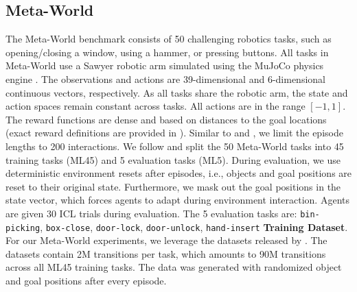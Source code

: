\documentclass{article}
\begin{document}
\subsection{Meta-World}\label{appendix:env-data-meta-world}
The Meta-World benchmark \citep{Yu:20} consists of 50 challenging robotics tasks, such as opening/closing a window, using a hammer, or pressing buttons.
All tasks in Meta-World use a Sawyer robotic arm simulated using the MuJoCo physics engine \citep{Todorov:12}.
The observations and actions are 39-dimensional and 6-dimensional continuous vectors, respectively.
As all tasks share the robotic arm, the state and action spaces remain constant across tasks.
All actions are in the range $[-1,1]$.
The reward functions are dense and based on distances to the goal locations (exact reward definitions are provided in \citet{Yu:20}).
Similar to \citet{Wolczyk:21} and \citet{Schmied:23}, we limit the episode lengths to 200 interactions.
We follow \citet{Yu:20} and split the 50 Meta-World tasks into 45 training tasks (ML45) and 5 evaluation tasks (ML5).
During evaluation, we use deterministic environment resets after episodes, i.e., objects and goal positions are reset to their original state.
Furthermore, we mask out the goal positions in the state vector, which forces agents to adapt during environment interaction.
Agents are given 30 ICL trials during evaluation.
The 5 evaluation tasks are:
\hspace{2.5cm}\texttt{bin-picking}, \texttt{box-close}, \texttt{door-lock}, \texttt{door-unlock}, \texttt{hand-insert}
\textbf{Training Dataset}.
For our Meta-World experiments, we leverage the datasets released by \citet{Schmied:23}.
The datasets contain 2M transitions per task, which amounts to 90M transitions across all ML45 training tasks.
The data was generated with randomized object and goal positions after every episode.
\end{document}
